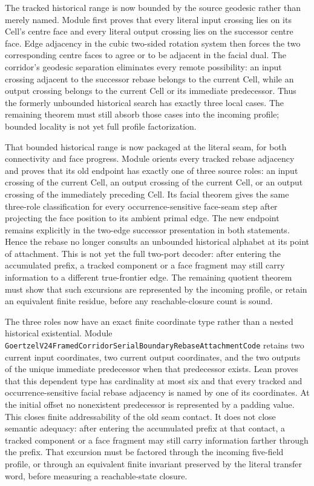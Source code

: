 \documentclass[11pt]{article}
\theoremstyle{definition}
\begin{document}
The tracked historical range is now bounded by the source geodesic rather
than merely named.  Module
first proves that every literal input crossing lies on its Cell's centre
face and every literal output crossing lies on the successor centre face.
Edge adjacency in the cubic two-sided rotation system then forces the two
corresponding centre faces to agree or to be adjacent in the facial dual.
The corridor's geodesic separation eliminates every remote possibility:
an input crossing adjacent to the successor rebase belongs to the current
Cell, while an output crossing belongs to the current Cell or its immediate
predecessor.  Thus the formerly unbounded historical search has exactly
three local cases.  The remaining theorem must still absorb those cases into
the incoming profile; bounded locality is not yet full profile factorization.

That bounded historical range is now packaged at the literal seam, for both
connectivity and face progress.  Module
orients every tracked rebase adjacency and proves that its old endpoint has
exactly one of three source roles: an input crossing of the current Cell, an
output crossing of the current Cell, or an output crossing of the immediately
preceding Cell.  Its facial theorem gives the same three-role classification
for every occurrence-sensitive face-seam step after projecting the face
position to its ambient primal edge.  The new endpoint remains explicitly in
the two-edge successor presentation in both statements.  Hence the rebase no
longer consults an unbounded historical alphabet at its point of attachment.
This is not yet the full two-port decoder: after entering the accumulated
prefix, a tracked component or a face fragment may still carry information to
a different true-frontier edge.  The remaining quotient theorem must show
that such excursions are represented by the incoming profile, or retain an
equivalent finite residue, before any reachable-closure count is sound.

The three roles now have an exact finite coordinate type rather than a nested
historical existential.  Module
\texttt{GoertzelV24FramedCorridorSerialBoundaryRebaseAttachmentCode}
retains two current input coordinates, two current output coordinates, and
the two outputs of the unique immediate predecessor when that predecessor
exists.  Lean proves that this dependent type has cardinality at most six and
that every tracked and occurrence-sensitive facial rebase adjacency is named
by one of its coordinates.  At the initial offset no nonexistent predecessor
is represented by a padding value.  This closes finite addressability of the
old seam contact.  It does not close semantic adequacy: after entering the
accumulated prefix at that contact, a tracked component or a face fragment may
still carry information farther through the prefix.  That excursion must be
factored through the incoming five-field profile, or through an equivalent
finite invariant preserved by the literal transfer word, before measuring a
reachable-state closure.
\end{document}
